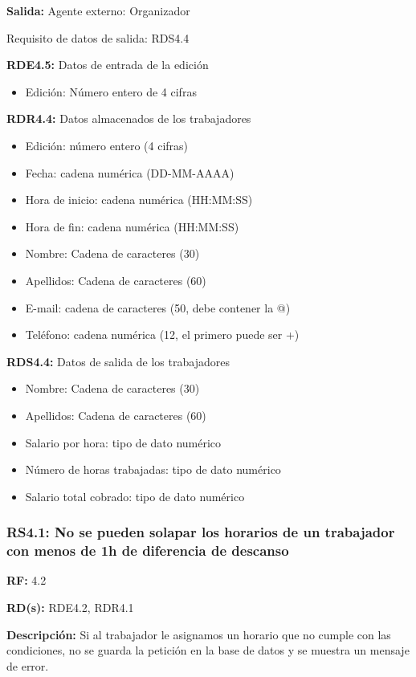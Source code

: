 \textbf{Salida:} Agente externo: Organizador

Requisito de datos de salida: RDS4.4

\textbf{RDE4.5:} Datos de entrada de la edición
\begin{itemize}
	\item Edición: Número entero de 4 cifras
\end{itemize}

\textbf{RDR4.4:} Datos almacenados de los trabajadores
\begin{itemize}
	\item Edición: número entero (4 cifras)
\newline
	\item Fecha: cadena numérica (DD-MM-AAAA)    
    \item Hora de inicio: cadena numérica (HH:MM:SS)
    \item Hora de fin: cadena numérica (HH:MM:SS)
\newline
	\item Nombre: Cadena de caracteres (30)
	\item Apellidos: Cadena de caracteres (60)
	\item E-mail: cadena de caracteres (50, debe contener la @)
	\item Teléfono: cadena numérica (12, el primero puede ser +)
\end{itemize}

\textbf{RDS4.4:} Datos de salida de los trabajadores
\begin{itemize}
	\item Nombre: Cadena de caracteres (30)
	\item Apellidos: Cadena de caracteres (60)
	\item Salario por hora: tipo de dato numérico
	\item Número de horas trabajadas: tipo de dato numérico
	\item Salario total cobrado: tipo de dato numérico
\end{itemize}

\subsubsection{RS4.1: No se pueden solapar los horarios de un trabajador con menos de 1h de diferencia de descanso}
\textbf{RF:} 4.2

\textbf{RD(s):} RDE4.2, RDR4.1

\textbf{Descripción:} Si al trabajador le asignamos un horario que no cumple con las condiciones, no se guarda la petición en la base de datos y se muestra un mensaje de error.

